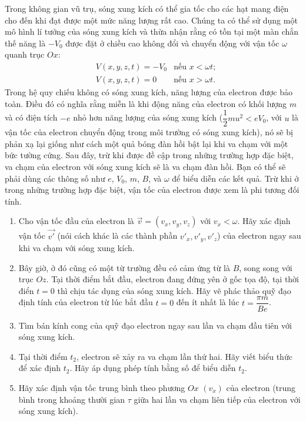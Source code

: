 \begin{vd}
Trong không gian vũ trụ, sóng xung kích có thể gia tốc cho các hạt mang điện cho đến khi đạt được một mức năng lượng rất cao. Chúng ta có thể sử dụng một mô hình lí tưởng của sóng xung kích và thừa nhận rằng có tồn tại một màn chắn thế năng là $-V_0$ được đặt ở chiều cao không đổi và chuyển động với vận tốc $\omega$ quanh trục $Ox$:
\[\begin{aligned}
    &V(x,y,z,t)=-V_0 &\text{nếu } x<\omega t;\\
    &V(x,y,z,t)=0 &\text{nếu } x>\omega t.
\end{aligned}\]
Trong hệ quy chiếu không có sóng xung kích, năng lượng của electron được bảo toàn. Điều đó có nghĩa rằng miễn là khi động năng của electron có khối lượng $m$ và có điện tích $-e$ nhỏ hơn năng lượng của sóng xung kích ($\dfrac{1}{2}mu^2<eV_0 $, với $u$ là vận tốc của electron chuyển động trong môi trường có sóng xung kích), nó sẽ bị phản xạ lại giống như cách một quả bóng đàn hồi bật lại khi va chạm với một bức tường cứng. Sau đây, trừ khi được đề cập trong những trường hợp đặc biệt, va chạm của electron với sóng xung kích sẽ là va chạm đàn hồi. Bạn có thể sẽ phải dùng các thông số như $e$, $V_0$, $m$, $B$, và $\omega$ để biểu diễn các kết quả. Trừ khi ở trong những trường hợp đặc biệt, vận tốc của electron được xem là phi tương đối tính.
\begin{enumerate}[1)]
    \item Cho vận tốc đầu của electron là $\overrightarrow{v}=(v_{x}, v_{y}, v_{z})$ với $v_{x}<\omega$. Hãy xác định vận tốc $\overrightarrow{v'}$ (nói cách khác là các thành phần $v'_{x}, v'_{y}, v'_{z}$) của electron ngay sau khi va chạm với sóng xung kích.
    \item Bây giờ, ở đó cũng có một từ trường đều có cảm ứng từ là $B$, song song với trục $Oz$. Tại thời điểm bắt đầu, electron đang đứng yên ở gốc tọa độ, tại thời điển $t=0$ thì chịu tác dụng của sóng xung kích. Hãy vẽ phác thảo quỹ đạo định tính của electron từ lúc bắt đầu $t=0$ đến ít nhất là lúc $t=\dfrac{\pi m}{Be}$.
    \item Tìm bán kính cong của quỹ đạo electron ngay sau lần va chạm đầu tiên với sóng xung kích.
    \item Tại thời điểm $t_2$, electron sẽ xảy ra va chạm lần thứ hai. Hãy viết biểu thức để xác định $t_2$. Hãy áp dụng phép tính bằng số để biểu diễn $t_2$.
    \item Hãy xác định vận tốc trung bình theo phương $Ox$ $(v_{x})$ của electron (trung bình trong khoảng thười gian $\tau$ giữa hai lần va chạm liên tiếp của electron với sóng xung kích).

\end{enumerate}
\end{vd}
